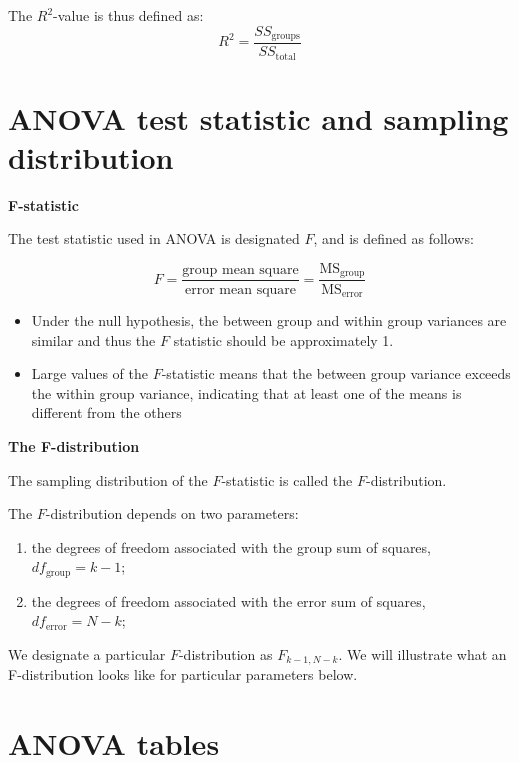 \documentclass[]{book}
\theoremstyle{definition}
\theoremstyle{definition}
\theoremstyle{definition}
\theoremstyle{remark}
\begin{document}
The \(R^2\)-value is thus defined as: \[
R^2 = \frac{SS_\text{groups}}{SS_\text{total}}
\]

\hypertarget{anova-test-statistic-and-sampling-distribution}{%
\section{ANOVA test statistic and sampling
distribution}\label{anova-test-statistic-and-sampling-distribution}}

\textbf{F-statistic}

The test statistic used in ANOVA is designated \(F\), and is defined as
follows:

\[
F = \frac{\text{group mean square}}{\text{error mean square}} = \frac{\text{MS}_\text{group}}{\text{MS}_\text{error}}
\]

\begin{itemize}
\item
  Under the null hypothesis, the between group and within group
  variances are similar and thus the \(F\) statistic should be
  approximately 1.
\item
  Large values of the \(F\)-statistic means that the between group
  variance exceeds the within group variance, indicating that at least
  one of the means is different from the others
\end{itemize}

\textbf{The F-distribution}

The sampling distribution of the \(F\)-statistic is called the
\(F\)-distribution.

The \(F\)-distribution depends on two parameters:

\begin{enumerate}
\def\labelenumi{\arabic{enumi})}
\item
  the degrees of freedom associated with the group sum of squares,
  \(df_\text{group} = k - 1\);
\item
  the degrees of freedom associated with the error sum of squares,
  \(df_\text{error} = N - k\);
\end{enumerate}

We designate a particular \(F\)-distribution as \(F_{k-1,N-k}\). We will
illustrate what an F-distribution looks like for particular parameters
below.

\hypertarget{anova-tables}{%
\section{ANOVA tables}\label{anova-tables}}
\end{document}
